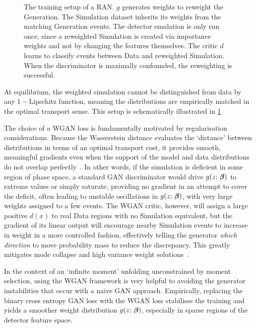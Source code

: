 {{\begin{figure}
        \centering
          \resizebox{\linewidth}{!}{}
        \caption[Schematic description of the training setup of a RAN.]{The training setup of a RAN.
        $g$ generates weights to reweight the Generation. The Simulation dataset inherits its weights from the matching Generation events.
        The detector emulation is only run once, since a reweighted Simulation is created via importance weights and not by changing the features themselves.
        The critic $d$ learns to classify events between Data and reweighted Simulation.
        When the discriminator is maximally confounded, the reweighting is successful. }
        \label{fig:ran-schematic}
    \end{figure}
            At equilibrium, the weighted simulation cannot be distinguished from data by any \(1-\)Lipschitz function, meaning the distributions are empirically matched in the optimal transport sense.
            This setup is schematically illustrated in \cref{fig:ran-schematic}
    
            The choice of a WGAN loss is fundamentally motivated by regularisation considerations.
            Because the Wasserstein distance evaluates the `distance' between distributions in terms of an optimal transport cost, it provides smooth, meaningful gradients even when the support of the model and data distributions do not overlap perfectly~\cite{arjovsky_wasserstein_2017, arjovsky_towards_2017}.
            In other words, if the simulation is deficient in some region of phase space, a standard GAN discriminator would drive $g(z;\,\vb*\beta)$ to extreme values or simply saturate, providing no gradient in an attempt to cover the deficit, often leading to unstable oscillations in $g(z;\,\vb*\beta)$, with very large weights assigned to a few events.
            The WGAN critic, however, will assign a large positive $d(x)$ to real Data regions with no Simulation equivalent, but the gradient of its linear output will encourage nearby Simulation events to increase in weight in a more controlled fashion, effectively telling the generator \emph{which direction} to move probability mass to reduce the discrepancy.
            This greatly mitigates mode collapse and high variance weight solutions~\cite{rosca_case_2021, doan_image_2020}.
            
            In the context of an `infinite moment' unfolding unconstrained by moment selection, using the WGAN framework is very helpful to avoiding the generator instabilities that occur with a naive GAN approach.
            Empirically, replacing the binary cross entropy GAN loss with the WGAN loss stabilises the training and yields a smoother weight distribution $g(z;\,\vb*\beta)$, especially in sparse regions of the detector feature space.
            
}}
